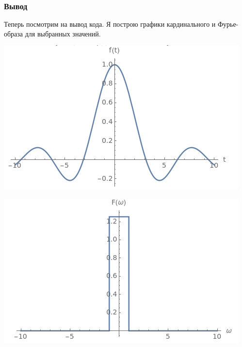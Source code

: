 \documentclass[a4paper,12pt]{article}
\begin{document}
\subsubsection{Вывод}
Теперь посмотрим на вывод кода. Я построю графики кардинального и Фурье-образа для выбранных значений.
\begin{center}
\begin{minipage}{0.48\textwidth}
  \centering
  \includegraphics[width=\linewidth]{images/3f11.png}
\end{minipage}
\hfill
\begin{minipage}{0.48\textwidth}
  \centering
  \includegraphics[width=\linewidth]{images/3F11.png}
\end{minipage}
\end{center}
\end{document}
